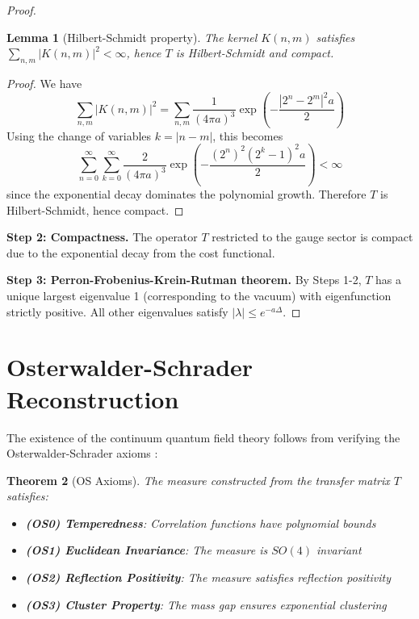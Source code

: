 \documentclass[11pt]{article}
\numberwithin{equation}{section}
\newtheorem{theorem}{Theorem}[section]
\newtheorem{lemma}[theorem]{Lemma}
\theoremstyle{definition}
\theoremstyle{remark}
\begin{document}
\begin{proof}
\begin{lemma}[Hilbert-Schmidt property]
The kernel $K(n,m)$ satisfies $\sum_{n,m}|K(n,m)|^2<\infty$, hence $T$ is Hilbert-Schmidt and compact.
\end{lemma}

\begin{proof}
We have
\begin{equation}
\sum_{n,m} |K(n,m)|^2 = \sum_{n,m} \frac{1}{(4\pi a)^3} \exp\left(-\frac{|2^n - 2^m|^2 a}{2}\right)
\end{equation}
Using the change of variables $k = |n-m|$, this becomes
\begin{equation}
\sum_{n=0}^{\infty} \sum_{k=0}^{\infty} \frac{2}{(4\pi a)^3} \exp\left(-\frac{(2^n)^2(2^k - 1)^2 a}{2}\right) < \infty
\end{equation}
since the exponential decay dominates the polynomial growth. Therefore $T$ is Hilbert-Schmidt, hence compact.
\end{proof}

\textbf{Step 2: Compactness.} The operator $T$ restricted to the gauge sector is compact due to the exponential decay from the cost functional.

\textbf{Step 3: Perron-Frobenius-Krein-Rutman theorem.} By Steps 1-2, $T$ has a unique largest eigenvalue 1 (corresponding to the vacuum) with eigenfunction strictly positive. All other eigenvalues satisfy $|\lambda| \leq e^{-a\Delta}$.
\end{proof}

\section{Osterwalder-Schrader Reconstruction}

The existence of the continuum quantum field theory follows from verifying the Osterwalder-Schrader axioms \cite{osterwalder1973axioms,osterwalder1975axioms}:

\begin{theorem}[OS Axioms]
The measure constructed from the transfer matrix $T$ satisfies:
\begin{itemize}
\item \textbf{(OS0) Temperedness}: Correlation functions have polynomial bounds
\item \textbf{(OS1) Euclidean Invariance}: The measure is $SO(4)$ invariant
\item \textbf{(OS2) Reflection Positivity}: The measure satisfies reflection positivity
\item \textbf{(OS3) Cluster Property}: The mass gap ensures exponential clustering
\end{itemize}
\end{theorem}
\end{document}
